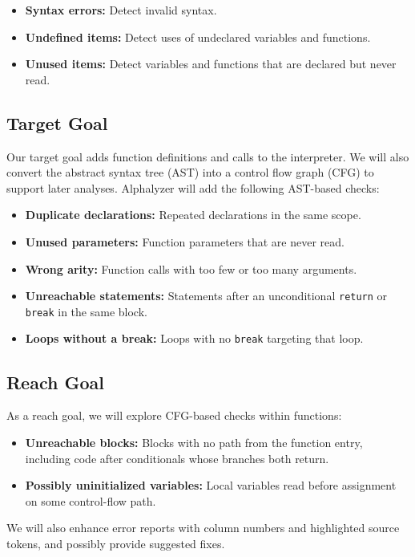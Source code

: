 \documentclass{article}
\begin{document}
\begin{itemize}
    \item \textbf{Syntax errors:}
    Detect invalid syntax.

    \item \textbf{Undefined items:}
    Detect uses of undeclared variables and functions.

    \item \textbf{Unused items:}
    Detect variables and functions that are declared but never read.

\end{itemize}

\subsection{Target Goal}
Our target goal adds function definitions and calls to the interpreter.
We will also convert the abstract syntax tree (AST) into a control flow
graph (CFG) to support later analyses.
Alphalyzer will add the following AST-based checks:
\begin{itemize}
    \setlength{\itemsep}{0pt}
    \item \textbf{Duplicate declarations:}
    Repeated declarations in the same scope.
    \item \textbf{Unused parameters:}
    Function parameters that are never read.
    \item \textbf{Wrong arity:}
    Function calls with too few or too many arguments.
    \item \textbf{Unreachable statements:}
    Statements after an unconditional \texttt{return} or
    \texttt{break} in the same block.
    \item \textbf{Loops without a break:}
    Loops with no \texttt{break} targeting that loop.
\end{itemize}

\subsection{Reach Goal}
As a reach goal, we will explore CFG-based checks within functions:
\begin{itemize}
    \setlength{\itemsep}{0pt}
    \item \textbf{Unreachable blocks:}
    Blocks with no path from the function entry, including code after
    conditionals whose branches both return.
    \item \textbf{Possibly uninitialized variables:}
    Local variables read before assignment on some control-flow path.
\end{itemize}
We will also enhance error reports with column numbers and highlighted source
tokens, and possibly provide suggested fixes.
\end{document}
